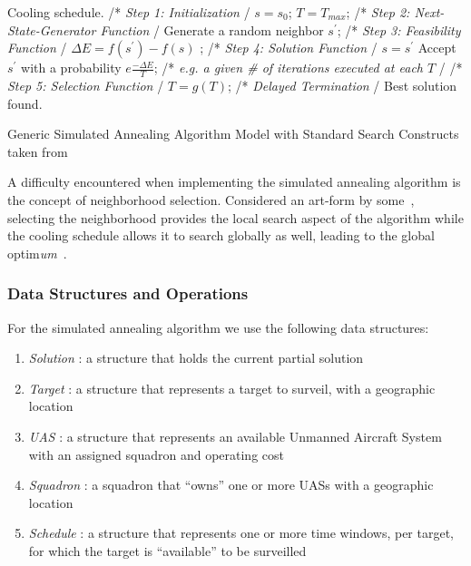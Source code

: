 \documentclass[conference]{IEEEtran}
\newcommand{\LineComment}[1]{\Statex /* \hfill \textit{#1} \hfill*/}    %
\begin{document}
\begin{algorithm}[ht!]
    \begin{algorithmic}[1]
      \Require Cooling schedule.
      \LineComment{Step 1: Initialization}
      \State $s = s_0$; 
      \State $T = T_{max}$; 
      \Repeat
        \Repeat 
          \LineComment{Step 2: Next-State-Generator Function}
          \State Generate a random neighbor $s^\prime$;
          \LineComment{Step 3: Feasibility Function}
          \State $\Delta E = f(s^\prime) - f(s)$ ;
          \LineComment{Step 4: Solution Function}
            \State $s = s^\prime$ 
          \Else
            \State Accept $s^\prime$ with a probability $e \frac{-\Delta E}{T}$;
          \EndIf
        \LineComment{e.g. a given \# of iterations executed at each $T$}
        \LineComment{Step 5: Selection Function}
      \State $T = g(T)$;  
      \LineComment{Delayed Termination}
      \Ensure Best solution found.
    \end{algorithmic}
    \caption{Generic Simulated Annealing Algorithm Model with Standard Search
    Constructs taken from~\cite{talbi2009}}
    \label{alg:SAmodel}
\end{algorithm}

A difficulty encountered when implementing the simulated annealing algorithm is
the concept of neighborhood selection. Considered an art-form by
some~\cite{hw9}, selecting the neighborhood provides the local search aspect of
the algorithm while the cooling schedule allows it to search globally as well,
leading to the global optim\emph{um}~\cite{wiki:SA}.

\subsubsection{Data Structures and Operations} \label{sec:SAdata}

For the simulated annealing algorithm we use the following data structures:

\begin{enumerate}
  \item[] \emph{Solution} : a structure that holds the current partial solution
  \item[] \emph{Target} : a structure that represents a target to surveil, with
    a geographic location
  \item[] \emph{UAS} : a structure that represents an available Unmanned
    Aircraft System with an assigned squadron and operating cost
  \item[] \emph{Squadron} : a squadron that ``owns'' one or more UASs with a
    geographic location
  \item[] \emph{Schedule} : a structure that represents one or more time
    windows, per target, for which the target is ``available'' to be surveilled
\end{enumerate}
\end{document}
